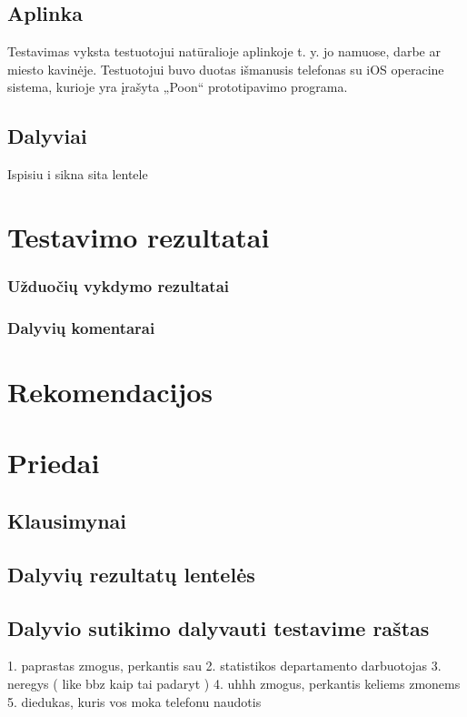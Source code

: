 \documentclass{VUMIFPSkursinis}
\begin{document}
\subsection{Aplinka}
Testavimas vyksta testuotojui natūralioje aplinkoje t. y. jo namuose, darbe ar miesto kavinėje. Testuotojui buvo duotas išmanusis telefonas su iOS operacine sistema, kurioje yra įrašyta  „Poon“ prototipavimo programa.

\subsection{Dalyviai}

Ispisiu i sikna sita lentele

\section{Testavimo rezultatai}
\subsubsection{Užduočių vykdymo rezultatai}
\subsubsection{Dalyvių komentarai}

\section{Rekomendacijos}

\section{Priedai}
\subsection{Klausimynai}
\subsection{Dalyvių rezultatų lentelės}
\subsection{Dalyvio sutikimo dalyvauti testavime raštas}





1. paprastas zmogus, perkantis sau
2. statistikos departamento darbuotojas
3. neregys ( like bbz kaip tai padaryt )
4. uhhh zmogus, perkantis keliems zmonems
5. diedukas, kuris vos moka telefonu naudotis













\printbibliography[heading=bibintoc, title=Šaltiniai]  %
\end{document}

